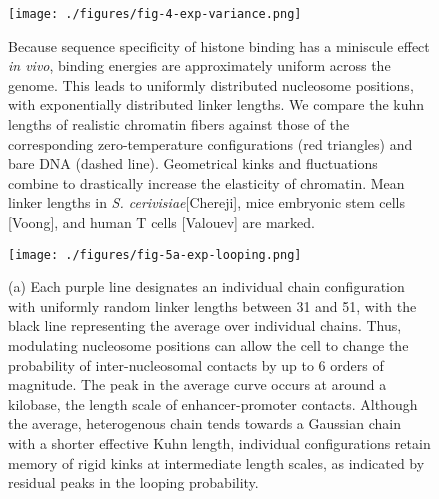 \documentclass[%
 reprint,
superscriptaddress,
showpacs,preprintnumbers,
 amsmath,amssymb,
 aps,
 prl,
]{revtex4-1}
\begin{document}
\begin{figure}[t]
    \centering
    \texttt{[image: ./figures/fig-4-exp-variance.png]}
    \caption{Because sequence specificity of histone binding has a miniscule effect
    \textit{in vivo}, binding energies are approximately uniform across the
    genome. This leads to uniformly distributed nucleosome positions, with exponentially distributed linker lengths. We compare
    the kuhn lengths of realistic chromatin fibers against those of the
    corresponding zero-temperature configurations (red
    triangles) and bare
    DNA (dashed line). Geometrical kinks and fluctuations combine to drastically
    increase the elasticity of chromatin. Mean linker lengths in \textit{S.
    cerivisiae}[Chereji], mice embryonic stem cells [Voong], and human T cells
    [Valouev] are marked.}
\end{figure}


\begin{figure}[t]
    \centering
    \texttt{[image: ./figures/fig-5a-exp-looping.png]}
    \caption{(a) Each purple line designates an individual chain configuration
    with uniformly random linker lengths between 31 and \SI{51}{\basepair}, with
    the black line representing the average over individual chains. Thus, modulating nucleosome positions can allow the cell to change
    the probability of inter-nucleosomal contacts by up to 6 orders of
    magnitude. The peak in the average curve occurs at around a kilobase, the
    length scale of enhancer-promoter contacts. Although the average,
    heterogenous chain tends towards a Gaussian chain with a shorter
    effective Kuhn length, individual configurations retain memory of rigid kinks
    at intermediate length scales, as indicated by residual peaks in the looping
    probability.}
\end{figure}
\end{document}
